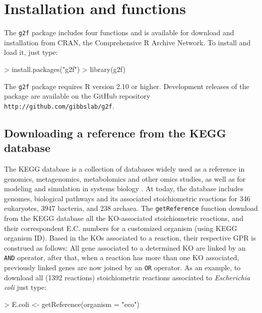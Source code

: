 \section{Installation and functions}
The \texttt{g2f} package includes four functions and is available for download and installation from CRAN, the
Comprehensive R Archive Network. To install and load it, just type:
\begin{Schunk}
\begin{Sinput}
> install.packages("g2f")
> library(g2f)
\end{Sinput}
\end{Schunk}
The \texttt{g2f} package requires R version 2.10 or higher. Development releases of the package are available on the GitHub repository \texttt{http://github.com/gibbslab/g2f}.
\subsection*{Downloading a reference from the KEGG database}
The KEGG database is a collection of databases widely used as a reference in genomics, metagenomics, metabolomics and other omics studies, as well as for modeling and simulation in systems biology \cite{kanehisa2006genomics}. At today, the database includes genomes, biological pathways and its associated stoichiometric reactions for 346 eukaryotes, 3947 bacteria, and 238 archaea. The \texttt{getReference} function download from the KEGG database all the KO-associated stoichiometric reactions, and their correspondent E.C. numbers for a customized organism (using KEGG organism ID). Based in the KOs associated to a reaction, their respective GPR is construed as follows: All gene associated to a determined KO are linked by an \texttt{AND} operator, after that, when a reaction has more than one KO associated, previously linked genes are now joined by an \texttt{OR} operator. As an example, to download all (1392 reactions) stoichiometric reactions associated to \textit{Escherichia coli} just type:
\begin{Schunk}
\begin{Sinput}
> E.coli <- getReference(organism = "eco")
\end{Sinput}
\end{Schunk}
